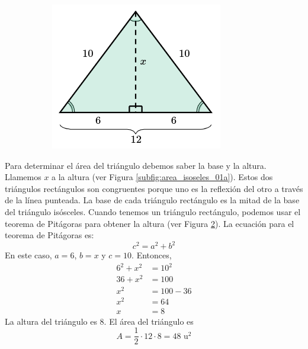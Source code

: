 \begin{solutionbox}{15cm}
\begin{figure}[H]
\begin{subfigure}{0.25\linewidth}
            \includegraphics[width=\linewidth]{../images/area_isoseles_01b.png}
            \caption{}
            \label{subfig:area_isoseles_01b}
        \end{subfigure}
    \end{figure}
    Para determinar el área del triángulo debemos saber la base y la altura. Llamemos $x$ a la altura (ver Figura \ref{subfig:area_isoseles_01a}).
    Estos dos triángulos rectángulos son congruentes porque uno es la reflexión del otro a través de la línea punteada.
    La base de cada triángulo rectángulo es la mitad de la base del triángulo isósceles.
    Cuando tenemos un triángulo rectángulo, podemos usar el teorema de Pitágoras para obtener la altura (ver Figura \ref{subfig:area_isoseles_01b}).
    La ecuación para el teorema de Pitágoras es:
    \[c^2=a^2+b^2\]
    En este caso, $a=6$, $b=x$ y $c=10$. Entonces,
    \begin{align*}
        6^2+x^2 & =10^2   \\
        36+x^2  & =100    \\
        x^2     & =100-36 \\
        x^2     & =64     \\
        x       & =8
    \end{align*}
    La altura del triángulo es 8.
    El área del triángulo es
    \[A=\frac{1}{2}\cdot 12 \cdot 8 = 48 \text{ u}^2\]
\end{solutionbox}